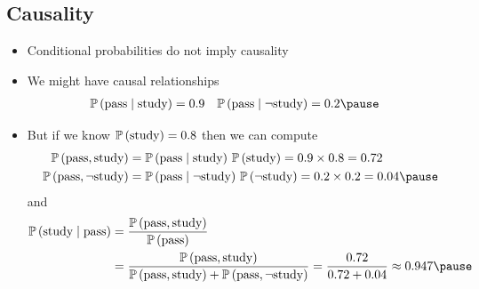 \begin{slide}
\section[-2]{Causality}

\begin{PauseHighLight}
  \begin{itemize}\squeeze
  \item Conditional probabilities do not imply causality\pause
  \item We might have causal relationships
    \begin{align*}
      \Prob{\text{pass}\mid\text{study}} &= 0.9
      &
        \Prob{\text{pass}\mid \neg\text{study}} &= 0.2\pause
    \end{align*}
  \item But if we know $\mathbb{P}\left( \text{study} \right)=0.8$ then we can compute
    \begin{align*}
      \Prob{\text{pass}, \text{study}}
      &= \Prob{\text{pass}\mid\text{study}} \, \Prob{\text{study}}=
        0.9\times0.8 =0.72 \\
      \Prob{\text{pass}, \neg\text{study}}
      &= \Prob{\text{pass}\mid \neg\text{study}} \, \Prob{\neg\text{study}}=
        0.2\times0.2 =0.04\pause
    \end{align*}
    and{\small
    \begin{align*}
      \Prob{\text{study}\mid\text{pass}}
      &= \frac{\Prob{\text{pass},   \text{study}}}{\Prob{\text{pass}}} \\
      &=\frac{\Prob{\text{pass},  \text{study}}}
        {\Prob{\text{pass},\text{study}}+\Prob{\text{pass},\neg\text{study}}}
        = \frac{0.72}{0.72 + 0.04} \approx 0.947\pause
    \end{align*}}
  \end{itemize}
\end{PauseHighLight}

\end{slide}


